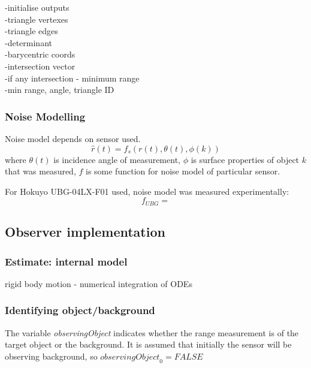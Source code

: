 	\begin{algorithm}[H]
	\SetAlgoLined
	
	-initialise outputs\\
	-triangle vertexes\\
	-triangle edges\\
	-determinant\\
	-barycentric coords\\
	-intersection vector\\
	-if any intersection - minimum range\\
		-min range, angle, triangle ID
	
	\caption{M{\"o}ller-Trumbore ray-triangle intersection algorithm}
	\end{algorithm}

	\subsubsection{Noise Modelling}
	Noise model depends on sensor used.
	\begin{equation}
		\hat{r}(t) = f_s(r(t),\theta(t),\phi(k))
	\end{equation}
	where $\theta(t)$ is incidence angle of measurement, $\phi$ is surface properties of object $k$ that was measured, $f$ is some function for noise model of particular sensor.
	
	For Hokuyo UBG-04LX-F01 used, noise model was measured experimentally:
	\begin{equation}
		f_{UBG} = 
	\end{equation}
	
\subsection{Observer implementation}
	\subsubsection{Estimate: internal model}
		rigid body motion - numerical integration of ODEs
	
	\subsubsection{Identifying object/background}
		The variable \textit{observingObject} indicates whether the range measurement is of the target object or the background. It is assumed that initially the sensor will be observing background, so $\textit{observingObject}_0 = FALSE$

